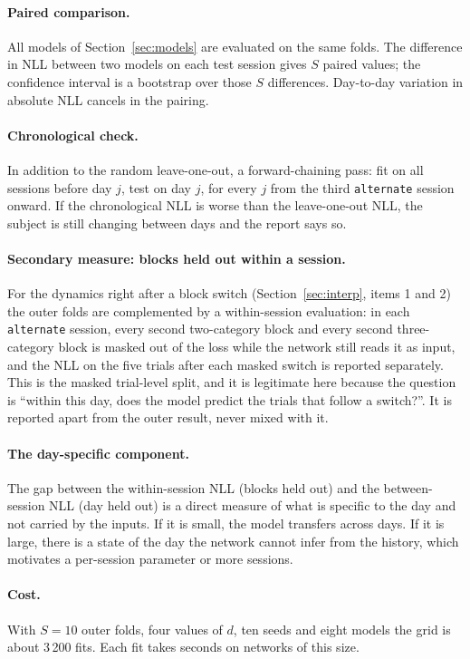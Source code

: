 \documentclass[11pt,a4paper]{article}
\begin{document}
\paragraph{Paired comparison.} All models of Section~\ref{sec:models} are evaluated on the same
folds. The difference in NLL between two models on each test session gives $S$ paired
values; the confidence interval is a bootstrap over those $S$ differences. Day-to-day
variation in absolute NLL cancels in the pairing.

\paragraph{Chronological check.} In addition to the random leave-one-out, a
forward-chaining pass: fit on all sessions before day $j$, test on day $j$, for every
$j$ from the third \texttt{alternate} session onward. If the chronological NLL is worse
than the leave-one-out NLL, the subject is still changing between days and the report
says so.

\paragraph{Secondary measure: blocks held out within a session.} For the dynamics
right after a block switch (Section~\ref{sec:interp}, items 1 and 2) the outer folds are complemented by
a within-session evaluation: in each \texttt{alternate} session, every second
two-category block and every second three-category block is masked out of the loss
while the network still reads it as input, and the NLL on the five trials after each
masked switch is reported separately. This is the masked trial-level split, and it is
legitimate here because the question is ``within this day, does the model predict the
trials that follow a switch?''. It is reported apart from the outer result, never
mixed with it.

\paragraph{The day-specific component.} The gap between the within-session NLL (blocks
held out) and the between-session NLL (day held out) is a direct measure of what is
specific to the day and not carried by the inputs. If it is small, the model transfers
across days. If it is large, there is a state of the day the network cannot infer from
the history, which motivates a per-session parameter or more sessions.

\paragraph{Cost.} With $S = 10$ outer folds, four values of $d$, ten seeds and eight
models the grid is about 3\,200 fits. Each fit takes seconds on networks of this size.
\end{document}
